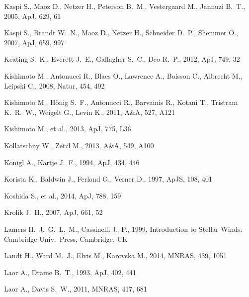 \documentclass[a4paper,fleqn,usenatbib]{mnras}
\begin{document}
\begin{thebibliography}{99}
 Kaspi S., Maoz D., Netzer H., Peterson B.~M., Vestergaard M., Jannuzi B.~T., 2005, ApJ, 629, 61
 
 Kaspi S., Brandt W.~N., Maoz D., Netzer H., Schneider D.~P., Shemmer O., 2007, ApJ, 659, 997
 
 Keating S.~K., Everett J.~E., Gallagher S.~C., Deo R.~P., 2012, ApJ, 749, 32
 
 Kishimoto M., Antonucci R., Blaes O., Lawrence A., Boisson C., Albrecht M., Leipski C., 2008, Natur, 454, 492 

 Kishimoto M., H{\"o}nig S.~F., Antonucci R., Barvainis R., Kotani T., Tristram K.~R.~W., Weigelt G., Levin K., 2011, A\&A, 527, A121 

 Kishimoto M., et al., 2013, ApJ, 775, L36 

 Kollatschny W., Zetzl M., 2013, A\&A, 549, A100 

 Konigl A., Kartje J.~F., 1994, ApJ, 434, 446 

 Korista K., Baldwin J., Ferland G., Verner D., 1997, ApJS, 108, 401 

 Koshida S., et al., 2014, ApJ, 788, 159 

 Krolik J.~H., 2007, ApJ, 661, 52 

 Lamers H.\ J.\ G.\ L.\ M., Cassinelli J.\ P., 1999, Introduction to Stellar Winds. Cambridge Univ.\ Press, Cambridge, UK

 Landt H., Ward M.~J., Elvis M., Karovska M., 2014, MNRAS, 439, 1051 

 Laor A., Draine B.~T., 1993, ApJ, 402, 441 

 Laor A., Davis S.~W., 2011, MNRAS, 417, 681 


\end{thebibliography}
\end{document}
